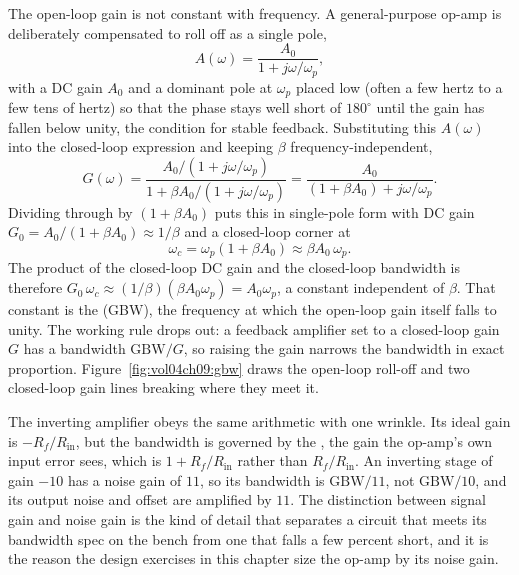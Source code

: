 The open-loop gain is not constant with frequency. A general-purpose
op-amp is deliberately compensated to roll off as a single pole,
\[
A(\omega) = \frac{A_0}{1 + j\omega/\omega_p},
\]
with a DC gain $A_0$ and a dominant pole at $\omega_p$ placed low (often
a few hertz to a few tens of hertz) so that the phase stays well short
of $180^\circ$ until the gain has fallen below unity, the condition for
stable feedback. Substituting this $A(\omega)$ into the closed-loop
expression and keeping $\beta$ frequency-independent,
\[
G(\omega) = \frac{A_0/(1 + j\omega/\omega_p)}
{1 + \beta A_0/(1 + j\omega/\omega_p)}
= \frac{A_0}{(1 + \beta A_0) + j\omega/\omega_p}.
\]
Dividing through by $(1 + \beta A_0)$ puts this in single-pole form with
DC gain $G_0 = A_0/(1 + \beta A_0) \approx 1/\beta$ and a closed-loop
corner at
\[
\omega_c = \omega_p(1 + \beta A_0) \approx \beta A_0\,\omega_p.
\]
The product of the closed-loop DC gain and the closed-loop bandwidth is
therefore $G_0\,\omega_c \approx (1/\beta)(\beta A_0\omega_p) =
A_0\omega_p$, a constant independent of $\beta$. That constant is the
 (GBW), the frequency at which the
open-loop gain itself falls to unity. The working rule drops out: a
feedback amplifier set to a closed-loop gain $G$ has a bandwidth
$\text{GBW}/G$, so raising the gain narrows the bandwidth in exact
proportion. Figure~\ref{fig:vol04ch09:gbw} draws the open-loop roll-off
and two closed-loop gain lines breaking where they meet it.



The inverting amplifier obeys the same arithmetic with one wrinkle. Its
ideal gain is $-R_f/R_{\text{in}}$, but the bandwidth is governed by the
, the gain the op-amp's own input error sees, which
is $1 + R_f/R_{\text{in}}$ rather than $R_f/R_{\text{in}}$. An inverting
stage of gain $-10$ has a noise gain of $11$, so its bandwidth is
$\text{GBW}/11$, not $\text{GBW}/10$, and its output noise and offset
are amplified by $11$. The distinction between signal gain and noise
gain is the kind of detail that separates a circuit that meets its
bandwidth spec on the bench from one that falls a few percent short, and
it is the reason the design exercises in this chapter size the op-amp by
its noise gain.

